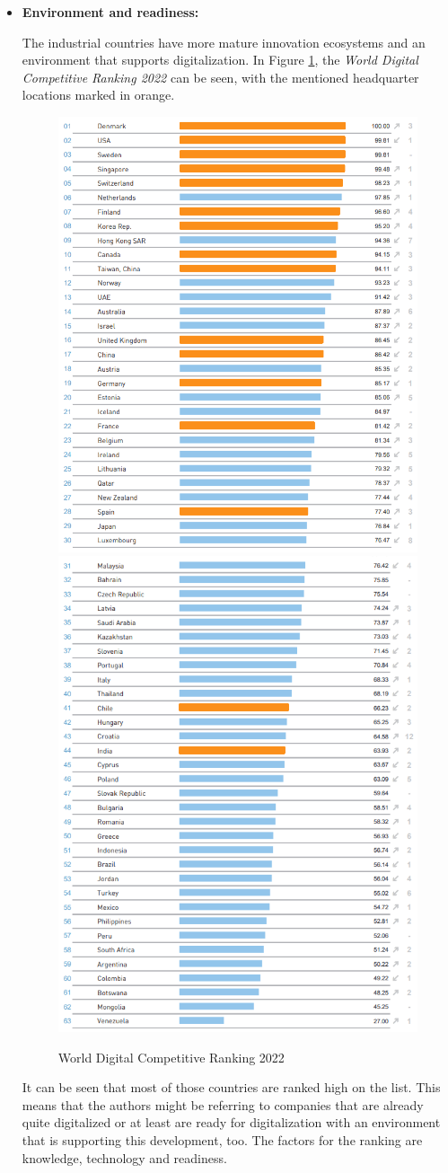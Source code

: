 \documentclass[a4]{scrartcl}
\begin{document}
\begin{itemize}
	

	
	\item \textbf{Environment and readiness:}  
	
	The industrial countries have more mature innovation ecosystems and an environment that supports digitalization. 
	In Figure \ref{fig:imd}, the \textit{World Digital Competitive Ranking 2022} can be seen, with the mentioned headquarter locations marked in orange. 
	
		
	\begin{figure}[H]
		\centering
		\includegraphics[height=0.5\textwidth]{images/IMD1.png} \hspace*{3.5em}
		\includegraphics[height=0.5\textwidth]{images/IMD2.png}
		\caption{World Digital Competitive Ranking 2022 \cite{WDCR}}
		\label{fig:imd}
	\end{figure}

	It can be seen that most of those countries are ranked high on the list. This means that the authors might be referring to companies that are already quite digitalized or at least are ready for digitalization with an environment that is supporting this development, too. The factors for the ranking are knowledge, technology and readiness. \cite{WDCR}
	


\end{itemize}
\end{document}
